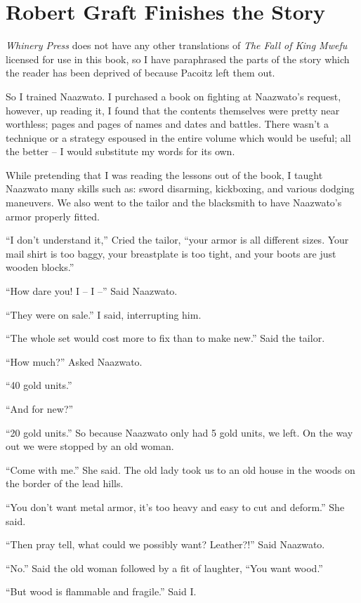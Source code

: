 \chapter{Robert Graft Finishes the Story}
\emph{Whinery Press} does not have any other translations of \emph{The Fall of King Mwefu} licensed for use in this book, so I have paraphrased the parts of the story which the reader has been deprived of because Pacoitz left them out.

So I trained Naazwato. I purchased a book on fighting at Naazwato's request, however, up reading it, I found that the contents themselves were pretty near worthless; pages and pages of names and dates and battles. There wasn't a technique or a strategy espoused in the entire volume which would be useful; all the better -- I would substitute my words for its own.

While pretending that I was reading the lessons out of the book, I taught Naazwato many skills such as: sword disarming, kickboxing, and various dodging maneuvers.  We also went to the tailor and the blacksmith to have Naazwato's armor properly fitted.

``I don't understand it,'' Cried the tailor, ``your armor is all different sizes. Your mail shirt is too baggy, your breastplate is too tight, and your boots are just wooden blocks.''

``How dare you! I -- I --'' Said Naazwato.

``They were on sale.'' I said, interrupting him.

``The whole set would cost more to fix than to make new.'' Said the tailor.

``How much?'' Asked Naazwato.

``40 gold units.'' 

``And for new?''

``20 gold units.'' So because Naazwato only had 5 gold units, we left. On the way out we were stopped by an old woman.

``Come with me.'' She said. The old lady took us to an old house in the woods on the border of the lead hills.

``You don't want metal armor, it's too heavy and easy to cut and deform.'' She said.

``Then pray tell, what could we possibly want? Leather?!'' Said Naazwato.

``No.'' Said the old woman followed by a fit of laughter, ``You want wood.''

``But wood is flammable and fragile.'' Said I.

